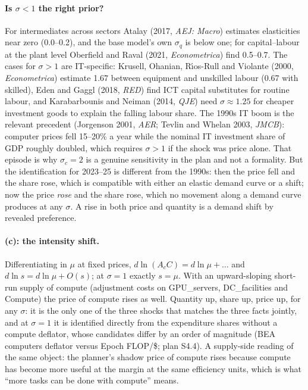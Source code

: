 \documentclass[11pt]{article}
\begin{document}
\paragraph{Is $\sigma<1$ the right prior?} For intermediates across sectors Atalay (2017, \emph{AEJ: Macro}) estimates elasticities near zero (0.0--0.2), and the base model's own $\sigma_q$ is below one; for capital--labour at the plant level Oberfield and Raval (2021, \emph{Econometrica}) find 0.5--0.7. The cases for $\sigma>1$ are IT-specific: Krusell, Ohanian, R\'{\i}os-Rull and Violante (2000, \emph{Econometrica}) estimate 1.67 between equipment and unskilled labour (0.67 with skilled), Eden and Gaggl (2018, \emph{RED}) find ICT capital substitutes for routine labour, and Karabarbounis and Neiman (2014, \emph{QJE}) need $\sigma\approx1.25$ for cheaper investment goods to explain the falling labour share. The 1990s IT boom is the relevant precedent (Jorgenson 2001, \emph{AER}; Tevlin and Whelan 2003, \emph{JMCB}): computer prices fell 15--20\% a year while the nominal IT investment share of GDP roughly doubled, which requires $\sigma>1$ if the shock was price alone. That episode is why $\sigma_c=2$ is a genuine sensitivity in the plan and not a formality. But the identification for 2023--25 is different from the 1990s: then the price fell and the share rose, which is compatible with either an elastic demand curve or a shift; now the price \emph{rose} and the share rose, which no movement along a demand curve produces at any $\sigma$. A rise in both price and quantity is a demand shift by revealed preference.

\paragraph{(c): the intensity shift.} Differentiating in $\mu$ at fixed prices, $d\ln(A_c C) = d\ln\mu + \ldots$ and $d\ln s = d\ln\mu + O(s)$; at $\sigma=1$ exactly $s=\mu$. With an upward-sloping short-run supply of compute (adjustment costs on GPU\_servers, DC\_facilities and Compute) the price of compute rises as well. Quantity up, share up, price up, for any $\sigma$: it is the only one of the three shocks that matches the three facts jointly, and at $\sigma=1$ it is identified directly from the expenditure shares without a compute deflator, whose candidates differ by an order of magnitude (BEA computers deflator versus Epoch FLOP/\$; plan S4.4). A supply-side reading of the same object: the planner's shadow price of compute rises because compute has become more useful at the margin at the same efficiency units, which is what ``more tasks can be done with compute'' means.
\end{document}

